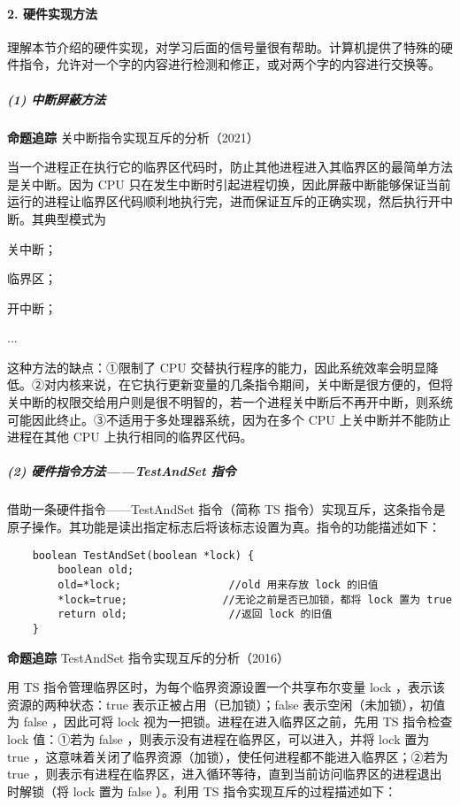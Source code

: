 \documentclass{ctexbook}
\begin{document}
	\paragraph{2. 硬件实现方法}
	
	理解本节介绍的硬件实现，对学习后面的信号量很有帮助。计算机提供了特殊的硬件指令，允许对一个字的内容进行检测和修正，或对两个字的内容进行交换等。
	
	\subparagraph{(1) 中断屏蔽方法}
	
	\textbf{命题追踪} 关中断指令实现互斥的分析（2021）
	
	当一个进程正在执行它的临界区代码时，防止其他进程进入其临界区的最简单方法是关中断。因为 CPU 只在发生中断时引起进程切换，因此屏蔽中断能够保证当前运行的进程让临界区代码顺利地执行完，进而保证互斥的正确实现，然后执行开中断。其典型模式为
	
	关中断；
	
	临界区；
	
	开中断；
	
	...
	
	这种方法的缺点：①限制了 CPU 交替执行程序的能力，因此系统效率会明显降低。②对内核来说，在它执行更新变量的几条指令期间，关中断是很方便的，但将关中断的权限交给用户则是很不明智的，若一个进程关中断后不再开中断，则系统可能因此终止。③不适用于多处理器系统，因为在多个 CPU 上关中断并不能防止进程在其他 CPU 上执行相同的临界区代码。
	
	\subparagraph{(2) 硬件指令方法——TestAndSet 指令}
	
	借助一条硬件指令——TestAndSet 指令（简称 TS 指令）实现互斥，这条指令是原子操作。其功能是读出指定标志后将该标志设置为真。指令的功能描述如下：
	
	\begin{lstlisting}
	boolean TestAndSet(boolean *lock) {
		boolean old;
		old=*lock;                 //old 用来存放 lock 的旧值
		*lock=true;               //无论之前是否已加锁，都将 lock 置为 true
		return old;                //返回 lock 的旧值
	}
	\end{lstlisting}
	\textbf{命题追踪} TestAndSet 指令实现互斥的分析（2016）
	
	用 TS 指令管理临界区时，为每个临界资源设置一个共享布尔变量 lock ，表示该资源的两种状态：true 表示正被占用（已加锁）；false 表示空闲（未加锁），初值为 false ，因此可将 lock 视为一把锁。进程在进入临界区之前，先用 TS 指令检查 lock 值：①若为 false ，则表示没有进程在临界区，可以进入，并将 lock 置为 true ，这意味着关闭了临界资源（加锁），使任何进程都不能进入临界区；②若为 true ，则表示有进程在临界区，进入循环等待，直到当前访问临界区的进程退出时解锁（将 lock 置为 false ）。利用 TS 指令实现互斥的过程描述如下：
	
\end{document}
